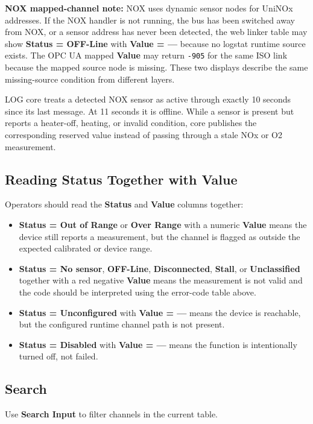 \documentclass[11pt,a4paper]{article}
\begin{document}
\textbf{NOX mapped-channel note:} NOX uses dynamic sensor nodes for UniNOx addresses. If the NOX handler is not running, the bus has been switched away from NOX, or a sensor address has never been detected, the web linker table may show \textbf{Status = OFF-Line} with \textbf{Value = ---} because no logstat runtime source exists. The OPC UA mapped \textbf{Value} may return \texttt{-905} for the same ISO link because the mapped source node is missing. These two displays describe the same missing-source condition from different layers.

LOG core treats a detected NOX sensor as active through exactly 10 seconds since its last message. At 11 seconds it is offline. While a sensor is present but reports a heater-off, heating, or invalid condition, core publishes the corresponding reserved value instead of passing through a stale NOx or O2 measurement.

\subsection{Reading Status Together with Value}
Operators should read the \textbf{Status} and \textbf{Value} columns together:

\begin{itemize}
\item \textbf{Status = Out of Range} or \textbf{Over Range} with a numeric \textbf{Value} means the device still reports a measurement, but the channel is flagged as outside the expected calibrated or device range.
\item \textbf{Status = No sensor}, \textbf{OFF-Line}, \textbf{Disconnected}, \textbf{Stall}, or \textbf{Unclassified} together with a red negative \textbf{Value} means the measurement is not valid and the code should be interpreted using the error-code table above.
\item \textbf{Status = Unconfigured} with \textbf{Value = ---} means the device is reachable, but the configured runtime channel path is not present.
\item \textbf{Status = Disabled} with \textbf{Value = ---} means the function is intentionally turned off, not failed.
\end{itemize}

\subsection{Search}
Use \textbf{Search Input} to filter channels in the current table.
\end{document}
